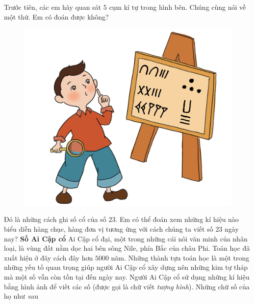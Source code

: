 \begin{multicols}{2}
\begin{figure}[H]
{}
		\vspace*{-10pt}
	\end{figure}
	Trước tiên, các em hãy quan sát $5$ cụm kí tự trong hình bên.  Chúng cùng nói về  một thứ. Em có đoán được không?
	\vskip 0.1cm
	\begin{figure}[H]
		\centering
		\vspace*{-5pt}
		\captionsetup{labelformat= empty, justification=centering}
		\includegraphics[width=0.85\linewidth]{20.12-pi}
		\vspace*{-10pt}
	\end{figure}
	Đó là những cách ghi số cổ của số $23$. Em có thể đoán xem những kí hiệu nào biểu diễn hàng chục, hàng đơn vị tương ứng với cách chúng ta viết số $23$ ngày nay?
	\vskip 0.1cm
	\textbf{Số Ai Cập cổ}
	\vskip 0.1cm
	Ai Cập cổ đại, một trong những cái nôi văn minh của nhân loại, là vùng đất nằm dọc hai bên sông Nile, phía Bắc của châu Phi. Toán học đã xuất hiện ở đây cách đây hơn $5000$ năm. Những thành tựu toán học là một trong những yếu tố quan trọng giúp người Ai Cập cổ xây dựng nên những kim tự tháp mà một số vẫn còn tồn tại đến ngày nay. 
	\vskip 0.1cm
	Người Ai Cập cổ sử dụng những kí hiệu bằng hình ảnh để viết các số (được gọi là chữ viết \textit{tượng hình}). Những chữ số của họ như~sau 
	\end{multicols}
